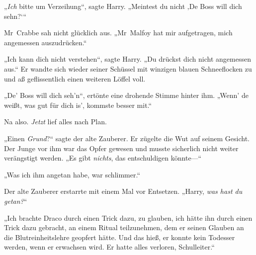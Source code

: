„\emph{Ich} bitte um Verzeihung“, sagte Harry. „Meintest du nicht ‚De Boss will dich sehn?‘“

Mr~Crabbe sah nicht glücklich aus. „Mr~Malfoy hat mir aufgetragen, mich angemessen auszudrücken.“

„Ich kann dich nicht verstehen“, sagte Harry. „Du drückst dich nicht angemessen aus.“ Er wandte sich wieder seiner Schüssel mit winzigen blauen Schneeflocken zu und aß geflissentlich einen weiteren Löffel voll.

„De’ Boss will dich seh’n“, ertönte eine drohende Stimme hinter ihm. „Wenn’ de weißt, was gut für dich is’, kommste besser mit.“

Na also. \emph{Jetzt} lief alles nach Plan.


„Einen \emph{Grund}?“ sagte der alte Zauberer. Er zügelte die Wut auf seinem Gesicht. Der Junge vor ihm war das Opfer gewesen und musste sicherlich nicht weiter verängstigt werden. „Es gibt \emph{nichts}, das entschuldigen könnte—“

„Was ich ihm angetan habe, war schlimmer.“

Der alte Zauberer erstarrte mit einem Mal vor Entsetzen. „Harry, \emph{was hast du getan?}“

„Ich brachte Draco durch einen Trick dazu, zu glauben, ich hätte ihn durch einen Trick dazu gebracht, an einem Ritual teilzunehmen, dem er seinen Glauben an die Blutreinheitslehre geopfert hätte. Und das hieß, er konnte kein Todesser werden, wenn er erwachsen wird. Er hatte alles verloren, Schulleiter.“

